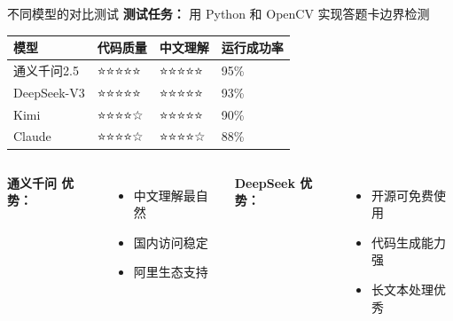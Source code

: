 \begin{frame}{不同模型的对比测试}
	\textbf{测试任务：} 用 Python 和 OpenCV 实现答题卡边界检测

	\vspace{0.3cm}

	\begin{table}
		\centering
		\small
		\begin{tabular}{p{2.5cm}p{3cm}p{3cm}p{3cm}}
			\toprule
			\textbf{模型}    & \textbf{代码质量} & \textbf{中文理解} & \textbf{运行成功率} \\
			\midrule
			通义千问2.5        & ⭐⭐⭐⭐⭐         & ⭐⭐⭐⭐⭐         & 95\%           \\
			DeepSeek-V3    & ⭐⭐⭐⭐⭐         & ⭐⭐⭐⭐⭐         & 93\%           \\
			Kimi            & ⭐⭐⭐⭐☆         & ⭐⭐⭐⭐⭐         & 90\%           \\
			Claude         & ⭐⭐⭐⭐☆         & ⭐⭐⭐⭐☆         & 88\%           \\
			\bottomrule
		\end{tabular}
	\end{table}

	\vspace{0.3cm}

	\begin{columns}
		\textbf{通义千问 优势：}
		\begin{itemize}
			\item 中文理解最自然
			\item 国内访问稳定
			\item 阿里生态支持
		\end{itemize}

		\textbf{DeepSeek 优势：}
		\begin{itemize}
			\item 开源可免费使用
			\item 代码生成能力强
			\item 长文本处理优秀
		\end{itemize}
	\end{columns}
\end{frame}
